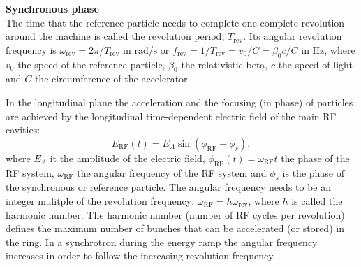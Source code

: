 

\textbf{Synchronous phase}\\
The time that the reference particle needs to complete one complete revolution around the machine is called the revolution period, $T_\mathrm{rev}$. Its angular revolution frequency is $\omega_\mathrm{rev} = 2\pi /T_\mathrm{rev}$ in rad/s or $f_\mathrm{rev}=1/T_\mathrm{rev} =  v_0/C = \beta_0 c/C$ in Hz, where $v_0$ the speed of the reference particle, $\beta_0$ the relativistic beta, $c$ the speed of light and $C$ the circumference of the accelerator.

In the longitudinal plane the acceleration and the focusing (in phase) of particles are achieved by the longitudinal time-dependent electric field of the main RF cavities:
\begin{equation}\label{eq:RF_cavity_EF}
    E_\mathrm{{RF}}(t) = E_A \sin{(\phi_\mathrm{{RF}} + \phi_s)},
\end{equation}
where $E_A$ it the amplitude of the electric field, $\phi_\mathrm{{RF}}(t) = \omega_\mathrm{{RF}}t$ the phase of the RF system, $\omega_\mathrm{{RF}}$ the angular frequency of the RF system and $\phi_s$ is the phase of the synchronous or reference particle. The angular frequency needs to be an integer mulitple of the revolution frequency: $ \omega_\mathrm{RF} = h \omega_\mathrm{rev}$, where $h$ is called the harmonic number. The harmonic number (number of RF cycles per revolution) defines the maximum number of bunches that can be accelerated (or stored) in the ring. %
In a synchrotron during the energy ramp the angular frequency increases in order to follow the increasing revolution frequency.

